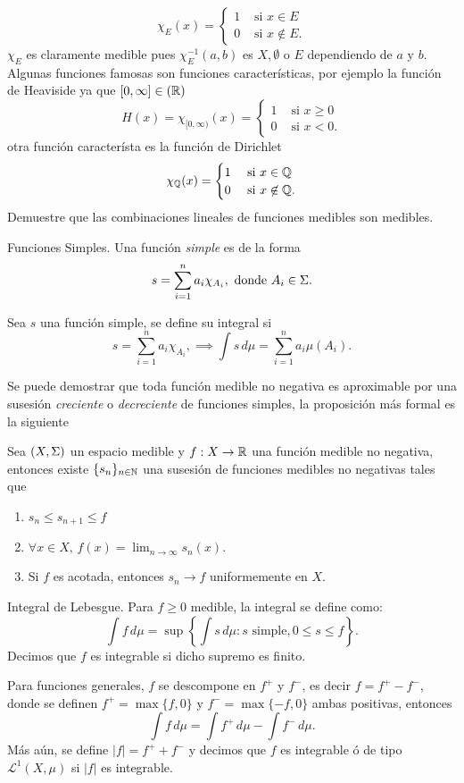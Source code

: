 \documentclass[main.tex]{subfiles}
\begin{document}
\[
\chi_E(x)=
    \begin{cases}
        1 & \text{ si } x\in E \\
        0 & \text{ si } x\not\in E.
    \end{cases}
\]
\noindent $\chi_E$ es claramente medible pues $\chi_E^{-1}(a, b)$ es $X,\emptyset$ o $E$ dependiendo de $a$ y $b$.
\eje Algunas funciones famosas son funciones características, por ejemplo la función de Heaviside ya que $[0,\infty]\in\mathbb(\mathbb R )$
\[
H(x)=\chi_{[0,\infty)}(x)=
    \begin{cases}
        1 & \text{ si } x\geq 0 \\
        0 & \text{ si } x<0.
    \end{cases}
\]
\noindent otra función característa es la función de Dirichlet
\[
\chi_{ \mathbb Q }(x)=
    \begin{cases}
        1 & \text{ si } x\in \mathbb Q  \\
        0 & \text{ si } x\not\in \mathbb Q .
    \end{cases}
\]
\exe Demuestre que las combinaciones lineales de funciones medibles son medibles.
\begin{def.}{Funciones Simples.}
Una función \emph{simple} es de la forma
\[
s = \sum_{i=1}^n a_i \chi_{A_i},\text{ donde }A_i \in \Sigma.
\]
\end{def.}
\begin{def.}
Sea $s$ una función simple, se define su integral si
\[
s = \sum_{i=1}^n a_i \chi_{A_i},\implies\int s \, d\mu = \sum_{i=1}^n a_i \mu(A_i).
\]
\end{def.}
\obs Se puede demostrar que toda función medible no negativa es aproximable por una susesión \emph{creciente} o \emph{decreciente} de funciones simples, la proposición más formal es la siguiente
\begin{prop}
  Sea $(X,\Sigma)$ un espacio medible y $f:X\to\mathbb R $ una función medible no negativa, entonces existe $\{s_n\}_{n\in \mathbb N }$ una susesión de funciones medibles no negativas tales que
  \begin{enumerate}
    \item $s_n\leq s_{n+1}\leq f$
    \item $\forall x \in X,\, f(x)=\lim_{n\to\infty}s_n(x).$
    \item Si $f$ es acotada, entonces $s_n\to f$ uniformemente en $X$.
  \end{enumerate}
  \end{prop}
\begin{def.}{Integral de Lebesgue.}
Para $f \geq 0$ medible, la integral se define como:
\[
\int f \, d\mu = \sup \left\{ \int s \, d\mu : s \text{ simple}, 0 \leq s \leq f \right\}.
\]
Decimos que $f$ es integrable si dicho supremo es finito.
\end{def.}
\obs Para funciones generales, $f$ se descompone en $f^+$ y $f^-$, es decir $f=f^{+}-f^{-}$, donde se definen $f^+=\max\{f,0\}$ y $f^{-}=\max\{-f,0\}$ ambas positivas, entonces
\[
\int f \, d\mu = \int f^{+}\,d\mu-\int f^{-}\,d\mu.
\]
Más aún, se define $|f|=f^{+}+f^{-}$ y decimos que $f$ es integrable ó de tipo $\mathcal{L}^1(X,\mu)$ si $|f|$ es integrable.
\end{document}

